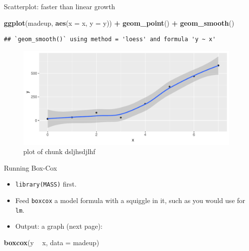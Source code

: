 \documentclass[ignorenonframetext,]{beamer}
\newenvironment{Shaded}{\begin{snugshade}}{\end{snugshade}}
\newcommand{\DataTypeTok}[1]{\textcolor[rgb]{0.13,0.29,0.53}{#1}}
\newcommand{\KeywordTok}[1]{\textcolor[rgb]{0.13,0.29,0.53}{\textbf{#1}}}
\newcommand{\NormalTok}[1]{#1}
\newcommand{\OperatorTok}[1]{\textcolor[rgb]{0.81,0.36,0.00}{\textbf{#1}}}
\newcommand{\StringTok}[1]{\textcolor[rgb]{0.31,0.60,0.02}{#1}}
\begin{document}
\begin{frame}[fragile]{Scatterplot: faster than linear growth}
\protect\hypertarget{scatterplot-faster-than-linear-growth}{}

\begin{Shaded}
\begin{Highlighting}[]
\KeywordTok{ggplot}\NormalTok{(madeup, }\KeywordTok{aes}\NormalTok{(}\DataTypeTok{x =}\NormalTok{ x, }\DataTypeTok{y =}\NormalTok{ y)) }\OperatorTok{+}\StringTok{ }\KeywordTok{geom_point}\NormalTok{() }\OperatorTok{+}
\StringTok{  }\KeywordTok{geom_smooth}\NormalTok{()}
\end{Highlighting}
\end{Shaded}

\begin{verbatim}
## `geom_smooth()` using method = 'loess' and formula 'y ~ x'
\end{verbatim}

\begin{figure}
\centering
\includegraphics{figure/dsljhsdjlhf-1.pdf}
\caption{plot of chunk dsljhsdjlhf}
\end{figure}

\end{frame}

\begin{frame}[fragile]{Running Box-Cox}
\protect\hypertarget{running-box-cox}{}

\begin{itemize}
\item
  \texttt{library(MASS)} first.
\item
  Feed \texttt{boxcox} a model formula with a squiggle in it, such as
  you would use for \texttt{lm}.
\item
  Output: a graph (next page):
\end{itemize}

\begin{Shaded}
\begin{Highlighting}[]
\KeywordTok{boxcox}\NormalTok{(y }\OperatorTok{~}\StringTok{ }\NormalTok{x, }\DataTypeTok{data =}\NormalTok{ madeup)}
\end{Highlighting}
\end{Shaded}

\end{frame}
\end{document}

